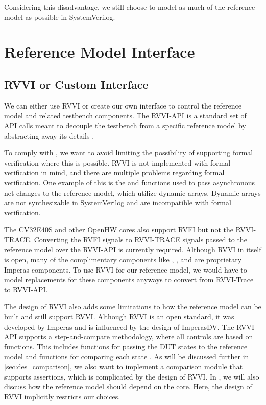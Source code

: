 Considering this disadvantage, we still choose to model as much of the reference model as possible in SystemVerilog. 

\section{Reference Model Interface}
\label{sec:rmInterface}

\subsection{RVVI or Custom Interface}

We can either use RVVI or create our own interface to control the reference model and related testbench components. The RVVI-API is a standard set of API calls meant to decouple the testbench from a specific reference model by abstracting away its details \cite{riscv-verificationRISCVVerificationInterface2023}. 

To comply with , we want to avoid limiting the possibility of supporting formal verification where this is possible. RVVI is not implemented with formal verification in mind, and there are multiple problems regarding formal verification. One example of this is the  and  functions used to pass asynchronous net changes to the reference model, which utilize dynamic arrays. Dynamic arrays are not synthesizable in SystemVerilog \cite{mehtaIntroductionSystemVerilog2021} and are incompatible with formal verification. 

The CV32E40S and other OpenHW cores also support RVFI but not the RVVI-TRACE. Converting the RVFI signals to RVVI-TRACE signals passed to the reference model over the RVVI-API is currently required. 
Although RVVI in itself is open, many of the complimentary components like , , and  are proprietary Imperas components. To use RVVI for our reference model, we would have to model replacements for these components anyways to convert from RVVI-Trace to RVVI-API. 

The design of RVVI also adds some limitations to how the reference model can be built and still support RVVI. Although RVVI is an open standard, it was developed by Imperas and is influenced by the design of ImperasDV. The RVVI-API supports a step-and-compare methodology, where all controls are based on functions. This includes functions for passing the DUT states to the reference model and functions for comparing each state \cite{riscv-verificationRISCVVerificationInterface2023}. As will be discussed further in \ref{sec:des_comparison}, we also want to implement a comparison module that supports assertions, which is complicated by the design of RVVI. 
In , we will also discuss how the reference model should depend on the core. Here, the design of RVVI implicitly restricts our choices. 

